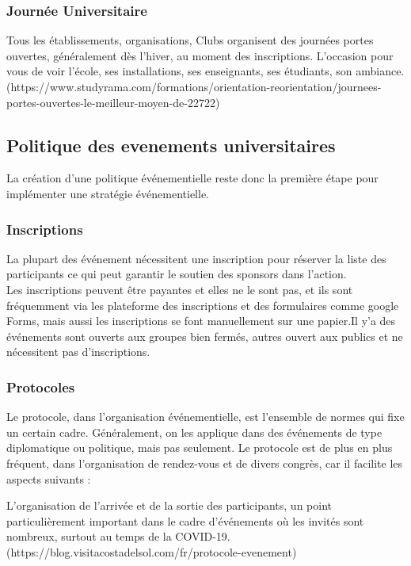 \documentclass[12pt]{report}
\begin{document}
\subsubsection{Journée Universitaire}

Tous les établissements, organisations, Clubs organisent des journées portes ouvertes, généralement dès l’hiver, au moment des inscriptions. L’occasion pour vous de voir l’école, ses installations, ses enseignants, ses étudiants, son ambiance.\\
(https://www.studyrama.com/formations/orientation-reorientation/journees-portes-ouvertes-le-meilleur-moyen-de-22722)

\subsection{Politique des evenements universitaires}

La création d’une politique événementielle reste donc la première étape pour implémenter une stratégie événementielle. 

\subsubsection{Inscriptions}

La plupart des événement nécessitent une 
inscription pour réserver la liste des participants 
ce qui peut garantir le soutien des sponsors dans l'action. 
\\Les inscriptions peuvent être payantes et elles ne le sont pas, 
et ils sont fréquemment via les plateforme des inscriptions 
et des formulaires comme google Forms, mais aussi les 
inscriptions se font manuellement sur une papier.Il y'a 
des événements sont ouverts aux groupes bien fermés, autres 
ouvert aux publics et ne nécessitent pas d'inscriptions. 


\subsubsection{Protocoles}

Le protocole, dans l’organisation événementielle, est l’ensemble de normes qui fixe un certain cadre. Généralement, on les applique dans des événements de type diplomatique ou politique, mais pas seulement. Le protocole est de plus en plus fréquent, dans l’organisation de rendez-vous et de divers congrès, car il facilite les aspects suivants :

L’organisation de l’arrivée et de la sortie des participants, un point particulièrement important dans le cadre d’événements où les invités sont nombreux, surtout au temps de la COVID-19.
\\(https://blog.visitacostadelsol.com/fr/protocole-evenement)
\end{document}
